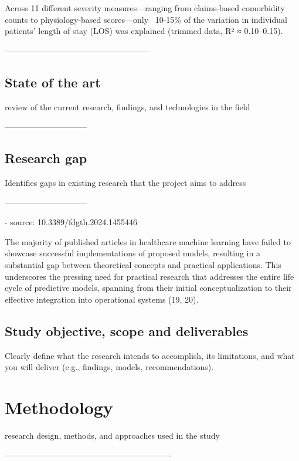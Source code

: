 \documentclass{article}
\begin{document}
    Across 11 different severity measures—ranging from claims-based comorbidity counts to physiology-based scores—only ~10-15\% of the variation in individual patients’ length of stay (LOS) was explained (trimmed data, R² ≈ 0.10–0.15).

-----------------------------------------------------

\subsection{State of the art}

review of the current research, findings, and technologies in the field


------------------------------



\subsection{Research gap}

Identifies gaps in existing research that the project aims to address


------------------------------

- source: 10.3389/fdgth.2024.1455446

The majority of published articles in healthcare machine learning
have failed to showcase successful implementations of proposed
models, resulting in a substantial gap between theoretical
concepts and practical applications. This underscores the pressing
need for practical research that addresses the entire life cycle of
predictive models, spanning from their initial conceptualization
to their effective integration into operational systems (19, 20).


\subsection{Study objective, scope and deliverables}

Clearly define what the research intends to accomplish, its limitations, and what you will deliver (e.g., findings, models, recommendations).

\section{Methodology}

 research design, methods, and approaches used in the study

    -------------------------------------------------------------
\end{document}
